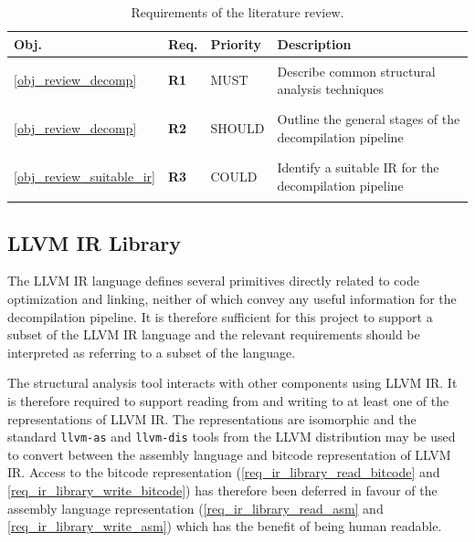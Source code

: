 \documentclass[12pt, a4paper]{article}
\makeatletter
\newcommand{\customlabel}[2]{
	\hypertarget{#1}{#2}
	\protected@write \@auxout {}{\string \newlabel {#1}{{#2}{\thepage}{#2}{#1}{}} }
}
\makeatother
\begin{document}
\begin{table}[htbp]
	\begin{center}
		\begin{tabular}{|l|l|l|l|}
			\hline
			Obj. & Req. & Priority & Description \\
			\hline
			\ref{obj_review_decomp} & \customlabel{req_review_structural_analysis}{\textbf{R1}} & MUST & Describe common structural analysis techniques \\
			\ref{obj_review_decomp} & \customlabel{req_review_decomp_stages}{\textbf{R2}} & SHOULD & Outline the general stages of the decompilation pipeline \\
			\ref{obj_review_suitable_ir} & \customlabel{req_review_suitable_ir}{\textbf{R3}} & COULD & Identify a suitable IR for the decompilation pipeline \\
			\hline
		\end{tabular}
	\end{center}
	\caption{Requirements of the literature review.}
\end{table}


\subsection{LLVM IR Library}

The LLVM IR language defines several primitives directly related to code optimization and linking, neither of which convey any useful information for the decompilation pipeline. It is therefore sufficient for this project to support a subset of the LLVM IR language and the relevant requirements should be interpreted as referring to a subset of the language.

The structural analysis tool interacts with other components using LLVM IR. It is therefore required to support reading from and writing to at least one of the representations of LLVM IR. The representations are isomorphic and the standard \texttt{llvm-as} and \texttt{llvm-dis} tools from the LLVM distribution may be used to convert between the assembly language and bitcode representation of LLVM IR. Access to the bitcode representation (\ref{req_ir_library_read_bitcode} and \ref{req_ir_library_write_bitcode}) has therefore been deferred in favour of the assembly language representation (\ref{req_ir_library_read_asm} and \ref{req_ir_library_write_asm}) which has the benefit of being human readable.
\end{document}
